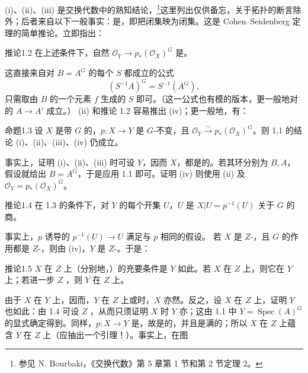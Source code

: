 (i)、(ii)、(iii) 是交换代数中的熟知结论，\footnote{参见 N. Bourbaki，《交换代数》第 5 章第 1 节和第 2 节定理 2。}这里列出仅供备忘，关于拓扑的断言除外；后者来自以下一般事实：是，即把闭集映为闭集。这是 Cohen--Seidenberg 定理的简单推论。立即指出：
\begin{SGAresult}{推论}{1.2}
在上述条件下，自然 $\mathcal O_Y\to p_*(\mathcal O_X)^G$ 是。
\end{SGAresult}
这直接来自对 $B=A^G$ 的每个 $S$ 都成立的公式
\[(S^{-1}A)^G=S^{-1}(A^G),\]
只需取由 $B$ 的一个元素 $f$ 生成的 $S$ 即可。（这一公式也有模的版本，更一般地对的 $A\to A'$ 成立。）
(ii) 和推论 1.2 容易推出 (iv)；更一般地，有：
\begin{SGAresult}{命题}{1.3}
设 $X$ 是带 $G$ 的，$p:X\to Y$ 是 $G$-不变，且 $\mathcal O_Y\xrightarrow{\sim}p_*(\mathcal O_X)^G$。则 1.1 的结论 (i)、(ii)、(iii)、(iv) 仍成立。
\end{SGAresult}
事实上，证明 (i)、(ii)、(iii) 时可设 $Y$，因而 $X$，都是的。若其环分别为 $B,A$，假设就给出 $B=A^G$，于是应用 1.1 即可。证明 (iv) 则使用 (ii) 及 $\mathcal O_Y=p_*(\mathcal O_X)^G$。
\begin{SGAresult}{推论}{1.4}
在 1.3 的条件下，对 $Y$ 的每个开集 $U$，$U$ 是 $X|U=p^{-1}(U)$ 关于 $G$ 的商。
\end{SGAresult}
事实上，$p$ 诱导的 $p^{-1}(U)\to U$ 满足与 $p$ 相同的假设。
若 $X$ 是 $Z$-，且 $G$ 的作用都是 $Z$-，则由 (iv)，$Y$ 是 $Z$-。于是：
\begin{SGAresult}{推论}{1.5}
$X$ 在 $Z$ 上（分别地，）的充要条件是 $Y$ 如此。若 $X$ 在 $Z$ 上，则它在 $Y$ 上；若进一步 $Z$ ，则 $Y$ 在 $Z$ 上。
\end{SGAresult}
由于 $X$ 在 $Y$ 上，因而，$Y$ 在 $Z$ 上或时，$X$ 亦然。反之，设 $X$ 在 $Z$ 上，证明 $Y$ 也如此：由 1.4 可设 $Z$ ，从而只须证明 $X$ 时 $Y$ 亦；这由 1.1 中 $Y=\operatorname{Spec}(A)^G$ 的显式确定得到。同样，$p:X\to Y$ 是，故是的，并且是满的；所以 $X$ 在 $Z$ 上蕴含 $Y$ 在 $Z$ 上（应抽出一个引理！）。事实上，在图
